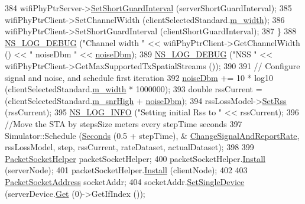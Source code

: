 \begin{DoxyCode}
384       wifiPhyPtrServer->\hyperlink{classns3_1_1WifiPhy_a3b53079e099f77124695c8d0612fa669}{SetShortGuardInterval} (serverShortGuardInterval);
385       wifiPhyPtrClient->SetChannelWidth (clientSelectedStandard.\hyperlink{structStandardInfo_a5b3709fd42061dfc2a51115978136abc}{m\_width});
386       wifiPhyPtrClient->SetShortGuardInterval (clientShortGuardInterval);
387     \}
388   \hyperlink{group__logging_ga413f1886406d49f59a6a0a89b77b4d0a}{NS\_LOG\_DEBUG} (\textcolor{stringliteral}{"Channel width "} << wifiPhyPtrClient->GetChannelWidth () << \textcolor{stringliteral}{" noiseDbm "} << 
      \hyperlink{wifi-manager-example_8cc_af9f95286ad3d5d533ca9d9b455e70398}{noiseDbm});
389   \hyperlink{group__logging_ga413f1886406d49f59a6a0a89b77b4d0a}{NS\_LOG\_DEBUG} (\textcolor{stringliteral}{"NSS "} << wifiPhyPtrClient->GetMaxSupportedTxSpatialStreams ());
390 
391   \textcolor{comment}{// Configure signal and noise, and schedule first iteration}
392   \hyperlink{wifi-manager-example_8cc_af9f95286ad3d5d533ca9d9b455e70398}{noiseDbm} += 10 * log10 (clientSelectedStandard.\hyperlink{structStandardInfo_a5b3709fd42061dfc2a51115978136abc}{m\_width} * 1000000);
393   \textcolor{keywordtype}{double} rssCurrent = (clientSelectedStandard.\hyperlink{structStandardInfo_a9015b8320c397f26eb0eb0d3758c9efa}{m\_snrHigh} + \hyperlink{wifi-manager-example_8cc_af9f95286ad3d5d533ca9d9b455e70398}{noiseDbm});
394   rssLossModel->\hyperlink{classns3_1_1FixedRssLossModel_acf2422ae57b98a4618c8da2b564980b4}{SetRss} (rssCurrent);
395   \hyperlink{group__logging_gafbd73ee2cf9f26b319f49086d8e860fb}{NS\_LOG\_INFO} (\textcolor{stringliteral}{"Setting initial Rss to "} << rssCurrent);
396   \textcolor{comment}{//Move the STA by stepsSize meters every stepTime seconds}
397   Simulator::Schedule (\hyperlink{group__timecivil_ga33c34b816f8ff6628e33d5c8e9713b9e}{Seconds} (0.5 + stepTime), &
      \hyperlink{wifi-manager-example_8cc_adeb3e022073e20a0edcca5f97eec50d9}{ChangeSignalAndReportRate}, rssLossModel, step, rssCurrent, rateDataset, 
      actualDataset);
398 
399   \hyperlink{classns3_1_1PacketSocketHelper}{PacketSocketHelper} packetSocketHelper;
400   packetSocketHelper.\hyperlink{classns3_1_1PacketSocketHelper_a33f449fee7fd10411949d17feba6d33e}{Install} (serverNode);
401   packetSocketHelper.\hyperlink{classns3_1_1PacketSocketHelper_a33f449fee7fd10411949d17feba6d33e}{Install} (clientNode);
402 
403   \hyperlink{classns3_1_1PacketSocketAddress}{PacketSocketAddress} socketAddr;
404   socketAddr.\hyperlink{classns3_1_1PacketSocketAddress_ad1caa016f4d27c9d5f2c06dbfc53f8a3}{SetSingleDevice} (serverDevice.\hyperlink{classns3_1_1NetDeviceContainer_a677d62594b5c9d2dea155cc5045f4d0b}{Get} (0)->GetIfIndex ());

\end{DoxyCode}
